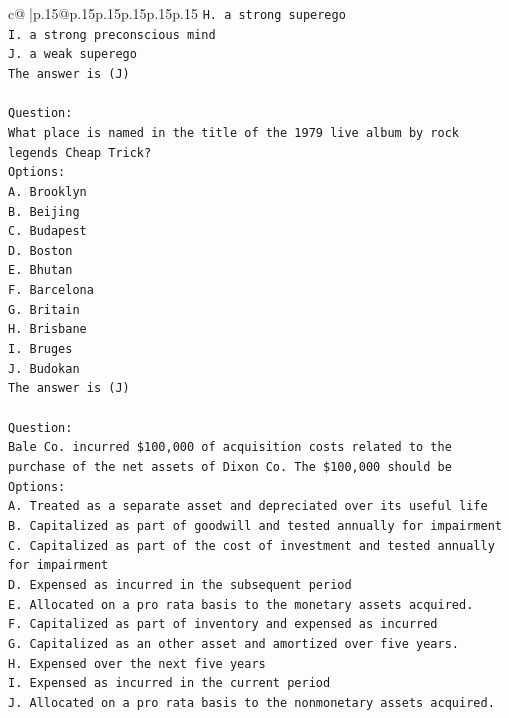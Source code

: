 \documentclass{article}
\begin{document}
{\begin{supertabular}{c@{$\;$}|p{.15\linewidth}@{}p{.15\linewidth}p{.15\linewidth}p{.15\linewidth}p{.15\linewidth}p{.15\linewidth}}
{{{\texttt{H. a strong superego} \\
\texttt{I. a strong preconscious mind} \\
\texttt{J. a weak superego} \\
\texttt{The answer is (J)} \\
\\ 
\texttt{Question:} \\
\texttt{What place is named in the title of the 1979 live album by rock legends Cheap Trick?} \\
\texttt{Options:} \\
\texttt{A. Brooklyn} \\
\texttt{B. Beijing} \\
\texttt{C. Budapest} \\
\texttt{D. Boston} \\
\texttt{E. Bhutan} \\
\texttt{F. Barcelona} \\
\texttt{G. Britain} \\
\texttt{H. Brisbane} \\
\texttt{I. Bruges} \\
\texttt{J. Budokan} \\
\texttt{The answer is (J)} \\
\\ 
\texttt{Question:} \\
\texttt{Bale Co. incurred \$100,000 of acquisition costs related to the purchase of the net assets of Dixon Co. The \$100,000 should be} \\
\texttt{Options:} \\
\texttt{A. Treated as a separate asset and depreciated over its useful life} \\
\texttt{B. Capitalized as part of goodwill and tested annually for impairment} \\
\texttt{C. Capitalized as part of the cost of investment and tested annually for impairment} \\
\texttt{D. Expensed as incurred in the subsequent period} \\
\texttt{E. Allocated on a pro rata basis to the monetary assets acquired.} \\
\texttt{F. Capitalized as part of inventory and expensed as incurred} \\
\texttt{G. Capitalized as an other asset and amortized over five years.} \\
\texttt{H. Expensed over the next five years} \\
\texttt{I. Expensed as incurred in the current period} \\
\texttt{J. Allocated on a pro rata basis to the nonmonetary assets acquired.} \\
            }
        }
    }
     \\ \\


\end{supertabular}}
\end{document}
